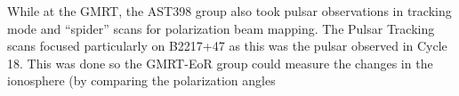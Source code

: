 \documentclass[a4paper,12pt]{article}
\begin{document}
                                                                                                                                                                                                                                                                                                                                                                                                                                                                                                                                                                                                                                                                                                                                                                                                                                                                                                                                                                                                                                                                                                                                                                                                                                                                                                                                                                                                                                                                                                                                                                                                                                                                                                                                                                                                                                                                                                                                                                                                                                                                                                                                                                                                                                                                                                                                                                                                                                                                                                                                                                                                                                                                                                                                                                                                                                                                                                                                                                                                                                                                                                    While at the GMRT, the AST398 group also took pulsar observations in tracking mode and “spider” scans for polarization beam mapping. The Pulsar Tracking scans focused particularly on B2217+47 as this was the pulsar observed in Cycle 18. This was done so the GMRT-EoR group could measure the changes in the ionosphere (by comparing the polarization angles 
\end{document}
